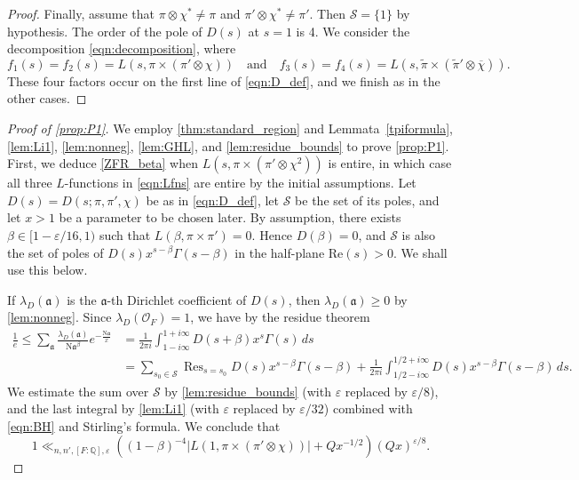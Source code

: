 \documentclass[12pt]{amsart}
\theoremstyle{definition}
\theoremstyle{remark}
\numberwithin{equation}{section}
\theoremstyle{plain}
\renewcommand{\tilde}{\widetilde}
\renewcommand{\bar}{\overline}
\renewcommand{\epsilon}{\varepsilon}
\renewcommand{\Re}{\mathrm{Re}}
\newcommand{\N}{\mathrm{N}}
\newcommand{\Q}{\mathbb{Q}}
\newcommand{\ka}{\mathfrak{a}}
\newcommand{\cO}{\mathcal{O}}
\begin{document}
\begin{proof}
Finally, assume that $\pi\otimes\chi^*\neq\pi$ and $\pi'\otimes\chi^*\neq\pi'$. Then $\mathcal{S}=\{1\}$ by hypothesis. The order of the pole of $D(s)$ at $s=1$ is 4. We consider the decomposition \eqref{eqn:decomposition}, where 
\[
f_1(s)=f_2(s)=L(s,\pi\times(\pi'\otimes\chi))\quad\text{and}\quad f_3(s)=f_4(s)=L(s,\tilde\pi\times(\tilde\pi'\otimes\bar{\chi})).
\]
These four factors occur on the first line of \eqref{eqn:D_def}, and we finish as in the other cases.
\end{proof}

\begin{proof}[Proof of \cref{prop:P1}]
We employ \cref{thm:standard_region} and Lemmata~\ref{tpiformula}, \ref{lem:Li1}, \ref{lem:nonneg}, \ref{lem:GHL}, and \ref{lem:residue_bounds} to prove \cref{prop:P1}.  First, we deduce \eqref{ZFR_beta} when $L(s,\pi\times(\pi'\otimes\chi^2))$ is entire, in which case all three $L$-functions in \eqref{eqn:Lfns} are entire by the initial assumptions.  Let $D(s)=D(s;\pi,\pi',\chi)$ be as in \eqref{eqn:D_def}, let $\mathcal{S}$ be the set of its poles, and let $x>1$ be a parameter to be chosen later. By assumption, there exists $\beta\in[1-\epsilon/16,1)$ such that $L(\beta,\pi\times\pi')=0$. Hence $D(\beta)=0$, and $\mathcal{S}$ is also the set of poles of $D(s)x^{s-\beta}\Gamma(s-\beta)$ in the half-plane $\Re(s)>0$.  We shall use this below.

If $\lambda_{D}(\ka)$ is the $\ka$-th Dirichlet coefficient of $D(s)$, then $\lambda_{D}(\ka)\geq 0$ by \cref{lem:nonneg}. Since $\lambda_{D}(\cO_F)=1$, we have by the residue theorem
\begin{align*}
\frac{1}{e}\leq \sum_{\ka}\frac{\lambda_{D}(\ka)}{\N\ka^{\beta}}e^{-\frac{\N\ka}{x}}&=\frac{1}{2\pi i}\int_{1-i\infty}^{1+i\infty}D(s+\beta)x^s\Gamma(s)\,ds\\
&=\sum_{s_0\in\mathcal{S}}\mathop{\mathrm{Res}}_{s=s_0}D(s)x^{s-\beta}\Gamma(s-\beta)
+\frac{1}{2\pi i}\int_{1/2-i\infty}^{1/2+i\infty}D(s)x^{s-\beta}\Gamma(s-\beta)\,ds.
\end{align*}
We estimate the sum over $\mathcal{S}$ by \cref{lem:residue_bounds} (with $\epsilon$ replaced by $\epsilon/8$), and the last integral by
\cref{lem:Li1} (with $\epsilon$ replaced by $\epsilon/32$) combined with \eqref{eqn:BH} and Stirling's formula. We conclude that
\begin{equation}
\label{eqn:previousbound}
1\ll_{n,n',[F:\Q],\epsilon} \left((1-\beta)^{-4}|L(1,\pi\times(\pi'\otimes\chi))|+Qx^{-1/2}\right)(Qx)^{\epsilon/8}.	
\end{equation}


\end{proof}
\end{document}
